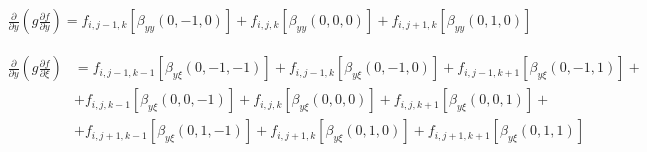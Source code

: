 \begin{equation*}
    \begin{split}
        \frac
            {\partial}
            {\partial y}
        \left(
            g
            \frac
                {\partial f}
                {\partial y}
        \right)
        =
        f_{i, j-1, k}
        \left[
            \beta_{yy} \left(0, -1, 0\right)
        \right]
        +
        f_{i, j, k}
        \left[
            \beta_{yy} \left(0, 0, 0\right)
        \right]
        +
        f_{i, j+1, k}
        \left[
            \beta_{yy} \left(0, 1, 0\right)
        \right]
    \end{split}
\end{equation*}

\begin{equation*}
    \begin{split}
        \frac
            {\partial}
            {\partial y}
        \left(
            g
            \frac
                {\partial f}
                {\partial \xi}
        \right)
        &
        =
        f_{i, j-1, k-1}
        \left[
            \beta_{y\xi} \left(0, -1, -1\right)
        \right]
        +
        f_{i, j-1, k}
        \left[
            \beta_{y\xi} \left(0, -1, 0\right)
        \right]
        +
        f_{i, j-1, k+1}
        \left[
            \beta_{y\xi} \left(0, -1, 1\right)
        \right]
        +
        \\
        &
        +
        f_{i, j, k-1}
        \left[
            \beta_{y\xi} \left(0, 0, -1\right)
        \right]
        +
        f_{i, j, k}
        \left[
            \beta_{y\xi} \left(0, 0, 0\right)
        \right]
        +
        f_{i, j, k+1}
        \left[
            \beta_{y\xi} \left(0, 0, 1\right)
        \right]
        +
        \\
        &
        +
        f_{i, j+1, k-1}
        \left[
            \beta_{y\xi} \left(0, 1, -1\right)
        \right]
        +
        f_{i, j+1, k}
        \left[
            \beta_{y\xi} \left(0, 1, 0\right)
        \right]
        +
        f_{i, j+1, k+1}
        \left[
            \beta_{y\xi} \left(0, 1, 1\right)
        \right]
    \end{split}
\end{equation*}

